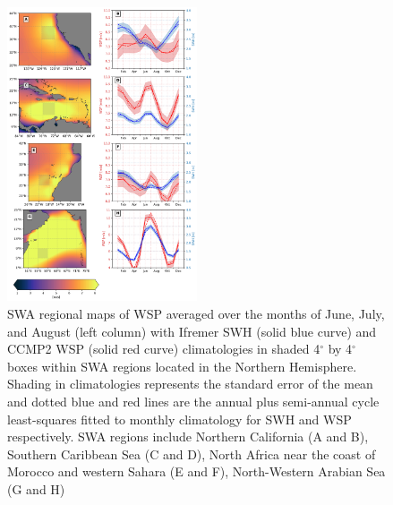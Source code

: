\documentclass[12pt,twoside]{article}
\begin{document}
\begin{figure}[tbh]
\centering
\includegraphics[width=0.5\textwidth]{figs/regional_climatologies/paper_regional_clima_nh.png}
\caption{SWA regional maps of WSP averaged over the months of June, July, and August (left column) with Ifremer SWH (solid blue curve) and CCMP2 WSP (solid red curve) climatologies in shaded 4$^{\circ}$ by 4$^{\circ}$ boxes within SWA regions located in the Northern Hemisphere. Shading in climatologies represents the standard error of the mean and dotted blue and red lines are the annual plus semi-annual cycle least-squares fitted to monthly climatology for SWH and WSP respectively. SWA regions include Northern California (A and B), Southern Caribbean Sea (C and D), North Africa near the coast of Morocco and western Sahara (E and F), North-Western Arabian Sea (G and H) }
\label{reg_clima_nh}
\end{figure}
\end{document}
